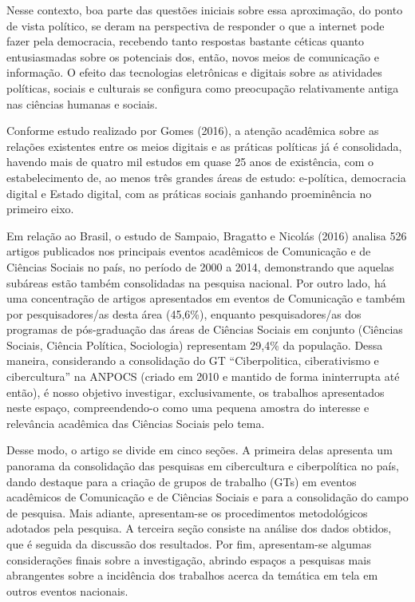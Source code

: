 Nesse contexto, boa parte das questões iniciais sobre essa aproximação,
do ponto de vista político, se deram na perspectiva de responder o que a
internet pode fazer pela democracia, recebendo tanto respostas bastante
céticas quanto entusiasmadas sobre os potenciais dos, então, novos meios
de comunicação e informação. O efeito das tecnologias eletrônicas e
digitais sobre as atividades políticas, sociais e culturais se configura
como preocupação relativamente antiga nas ciências humanas e sociais.

Conforme estudo realizado por Gomes (2016), a atenção acadêmica sobre as
relações existentes entre os meios digitais e as práticas políticas já é
consolidada, havendo mais de quatro mil estudos em quase 25 anos de
existência, com o estabelecimento de, ao menos três grandes áreas de
estudo: e-política, democracia digital e Estado digital, com as práticas
sociais ganhando proeminência no primeiro eixo.

Em relação ao Brasil, o estudo de Sampaio, Bragatto e Nicolás (2016)
analisa 526 artigos publicados nos principais eventos acadêmicos de
Comunicação e de Ciências Sociais no país, no período de 2000 a 2014,
demonstrando que aquelas subáreas estão também consolidadas na pesquisa
nacional. Por outro lado, há uma concentração de artigos apresentados em
eventos de Comunicação e também por pesquisadores/as desta área
(45,6\%), enquanto pesquisadores/as dos programas de pós-graduação das
áreas de Ciências Sociais em conjunto (Ciências Sociais, Ciência
Política, Sociologia) representam 29,4\% da população. Dessa maneira,
considerando a consolidação do GT ``Ciberpolitica, ciberativismo e
cibercultura'' na ANPOCS (criado em 2010 e mantido de forma ininterrupta
até então), é nosso objetivo investigar, exclusivamente, os trabalhos
apresentados neste espaço, compreendendo-o como uma pequena amostra do
interesse e relevância acadêmica das Ciências Sociais pelo tema.

Desse modo, o artigo se divide em cinco seções. A primeira delas
apresenta um panorama da consolidação das pesquisas em cibercultura e
ciberpolítica no país, dando destaque para a criação de grupos de
trabalho (GTs) em eventos acadêmicos de Comunicação e de Ciências
Sociais e para a consolidação do campo de pesquisa. Mais adiante,
apresentam-se os procedimentos metodológicos adotados pela pesquisa. A
terceira seção consiste na análise dos dados obtidos, que é seguida da
discussão dos resultados. Por fim, apresentam-se algumas considerações
finais sobre a investigação, abrindo espaços a pesquisas mais
abrangentes sobre a incidência dos trabalhos acerca da temática em tela
em outros eventos nacionais.

